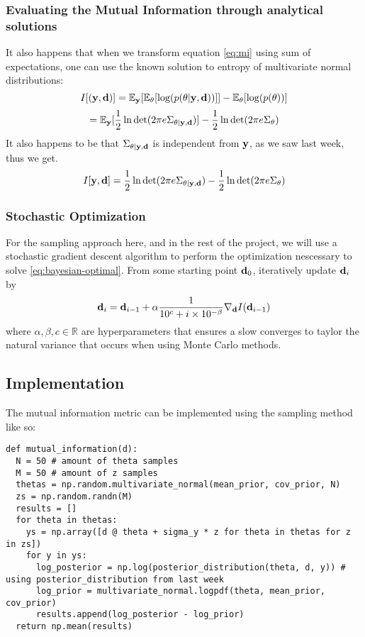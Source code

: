 \subsubsection{Evaluating the Mutual Information through analytical solutions}
It also happens that when we transform equation \ref{eq:mi} using sum of expectations, one can use the known solution to entropy of multivariate normal distributions:
\begin{equation} I[(\mathbf{y}, \mathbf{d})]  = \mathbb{E}_{\mathbf{y}}[\mathbb{E}_\theta [\log(p(\theta | \mathbf{y}, \mathbf{d}))]] - \mathbb{E}_\theta[\log(p(\theta))]\end{equation}
$$= \mathbb{E}_{\mathbf{y}}[\frac{1}{2}\ln \det (2\pi e \Sigma_{\theta|\mathbf{y,d}})] - \frac{1}{2}\ln \det (2\pi e\Sigma_\theta)$$
It also happens to be that $\Sigma_{\theta|\mathbf{y,d}}$ is independent from $\mathbf{y}$, as we saw last week, thus we get.
\begin{equation} I[\mathbf{y}, \mathbf{d}]  = \frac{1}{2}\ln \det (2\pi e \Sigma_{\theta|\mathbf{y,d}}) - \frac{1}{2}\ln \det (2\pi e\Sigma_\theta)\end{equation}

\subsubsection{Stochastic Optimization}
For the sampling approach here, and in the rest of the project, we will use a stochastic gradient descent algorithm to perform the optimization nescessary to solve \ref{eq:bayesian-optimal}.
From some starting point $\mathbf{d}_0$, iteratively update $\mathbf{d}_i$ by
\begin{equation}
  \mathbf{d}_i = \mathbf{d}_{i-1} + \alpha \frac{1}{10^c + i \times 10^{-\beta}} \nabla_{\mathbf{d}} I(\mathbf{d}_{i-1})
\end{equation}
where $\alpha, \beta, c \in \mathbb{R}$ are hyperparameters that ensures a slow converges to taylor the natural variance that occurs when using Monte Carlo methods.

\subsection{Implementation}
The mutual information metric can be implemented using the sampling method like so:
\begin{verbatim}
def mutual_information(d):
  N = 50 # amount of theta samples
  M = 50 # amount of z samples
  thetas = np.random.multivariate_normal(mean_prior, cov_prior, N)
  zs = np.random.randn(M)
  results = []
  for theta in thetas:
    ys = np.array([d @ theta + sigma_y * z for theta in thetas for z in zs])
    for y in ys:
      log_posterior = np.log(posterior_distribution(theta, d, y)) # using posterior_distribution from last week
      log_prior = multivariate_normal.logpdf(theta, mean_prior, cov_prior)
      results.append(log_posterior - log_prior)
  return np.mean(results)
\end{verbatim}

